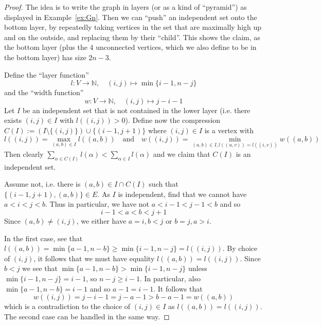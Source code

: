 \documentclass{scrartcl}
\newcommand{\N}{\mathbb{N}}
\theoremstyle{definition}
\begin{document}
\begin{proof}
    The idea is to write the graph in layers (or as a kind of ``pyramid'') as displayed in Example~\ref{ex:Gn}.
    Then we can ``push'' an independent set onto the bottom layer, by repeatedly taking vertices in the set that are maximally high up and on the outside, and replacing them by their ``child''. 
    This shows the claim, as the bottom layer (plus the 4 unconnected vertices, which we also define to be in the bottom layer) has size $2n - 3$.

    Define the ``layer function''
    \begin{equation*}
        l: V \to \N, \quad (i, j) \mapsto \min\{i - 1, n - j\}
    \end{equation*}
    and the ``width function''
    \begin{equation*}
        w: V \to \N, \quad (i, j) \mapsto j - i - 1
    \end{equation*}
    Let $I$ be an independent set that is not contained in the lower layer (i.e. there exists $(i, j) \in I$ with $l((i, j)) > 0$). 
    Define now the compression $C(I) := (I \setminus \{(i, j)\}) \cup \{(i - 1, j + 1)\}$ where $(i, j) \in I$ is a vertex with
    \begin{equation*}
        l((i, j)) = \max_{(a, b) \in I} l((a, b)) \quad \text{and} \quad w((i, j)) = \min_{(a, b) \in I, l((u, v)) = l((i, v))} w((a, b))
    \end{equation*}
    Then clearly $\sum_{\alpha \in C(I)} l(\alpha) < \sum_{\alpha \in I} l(\alpha)$ and we claim that $C(I)$ is an independent set.

    Assume not, i.e. there is $(a, b) \in I \cap C(I)$ such that $\{(i - 1, j + 1), (a, b)\} \in E$.
    As $I$ is independent, find that we cannot have $a < i < j < b$.
    Thus in particular, we have not $a < i - 1 < j - 1 < b$ and so
    \begin{equation*}
        i - 1 < a < b < j + 1
    \end{equation*}
    Since $(a, b) \neq (i, j)$, we either have $a = i, b < j$ or $b = j, a > i$.
    
    In the first case, see that $l((a, b)) = \min\{a - 1, n - b\} \geq \min\{i - 1, n - j\} = l((i, j))$.
    By choice of $(i, j)$, it follows that we must have equality $l((a, b)) = l((i, j))$.
    Since $b < j$ we see that $\min\{a - 1, n - b\} > \min\{i - 1, n - j\}$ unless $\min\{i - 1, n - j\} = i - 1$, so $n - j \geq i - 1$.
    In particular, also $\min\{a - 1, n - b\} = i - 1$ and so $a - 1 = i - 1$.
    It follows that
    \begin{equation*}
        w((i, j)) = j - i - 1 = j - a - 1 > b - a - 1 = w((a, b))
    \end{equation*}
    which is a contradiction to the choice of $(i, j) \in I$ as $l((a, b)) = l((i, j))$.
    The second case can be handled in the same way.


\end{proof}
\end{document}
